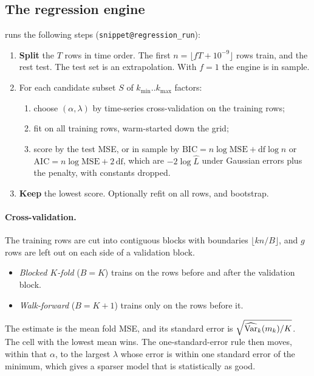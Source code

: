\documentclass[11pt,a4paper]{article}
\makeatletter
\newcommand{\snippetsource}[1]{\csname snippet@#1\endcsname}
\newcommand{\coderef}[1]{{\footnotesize\texttt{\snippetsource{#1}}}}
\makeatother
\begin{document}
\subsection{The regression engine}
 runs the following steps (\coderef{regression_run}):
\begin{enumerate}
  \item \textbf{Split} the $T$ rows in time order. The first
        $n=\lfloor fT+10^{-9}\rfloor$ rows train, and the rest test. The test set is an
        extrapolation. With $f=1$ the engine is in sample.
  \item For each candidate subset $S$ of $k_{\min}..k_{\max}$ factors:
        \begin{enumerate}
          \item choose $(\alpha,\lambda)$ by time-series cross-validation on the training
                rows;
          \item fit on all training rows, warm-started down the grid;
          \item score by the test MSE, or in sample by
                $\mathrm{BIC}=n\log\mathrm{MSE}+\mathrm{df}\log n$ or
                $\mathrm{AIC}=n\log\mathrm{MSE}+2\,\mathrm{df}$, which are $-2\log\hat L$
                under Gaussian errors plus the penalty, with constants dropped.
        \end{enumerate}
  \item \textbf{Keep} the lowest score. Optionally refit on all rows, and bootstrap.
\end{enumerate}

\paragraph{Cross-validation.} The training rows are cut into contiguous blocks with
boundaries $\lfloor kn/B\rfloor$, and $g$ rows are left out on each side of a validation
block.
\begin{itemize}
  \item \emph{Blocked $K$-fold} ($B=K$) trains on the rows before and after the validation
        block.
  \item \emph{Walk-forward} ($B=K+1$) trains only on the rows before it.
\end{itemize}
The estimate is the mean fold MSE, and its standard error is
$\sqrt{\widehat{\operatorname{Var}}_k(m_k)/K}$. The cell with the lowest mean wins. The one-standard-error
rule then moves, within that $\alpha$, to the largest $\lambda$ whose error is within one
standard error of the minimum, which gives a sparser model that is statistically as good.
\end{document}
